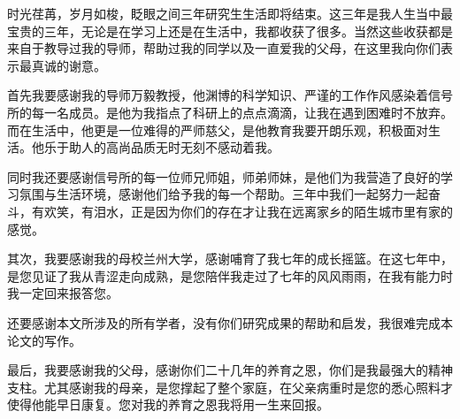 \begin{thanks}
时光荏苒，岁月如梭，眨眼之间三年研究生生活即将结束。这三年是我人生当中最宝贵的三年，无论是在学习上还是在生活中，我都收获了很多。当然这些收获都是来自于教导过我的导师，帮助过我的同学以及一直爱我的父母，在这里我向你们表示最真诚的谢意。

首先我要感谢我的导师万毅教授，他渊博的科学知识、严谨的工作作风感染着信号所的每一名成员。是他为我指点了科研上的点点滴滴，让我在遇到困难时不放弃。而在生活中，他更是一位难得的严师慈父，是他教育我要开朗乐观，积极面对生活。他乐于助人的高尚品质无时无刻不感动着我。

同时我还要感谢信号所的每一位师兄师姐，师弟师妹，是他们为我营造了良好的学习氛围与生活环境，感谢他们给予我的每一个帮助。三年中我们一起努力一起奋斗，有欢笑，有泪水，正是因为你们的存在才让我在远离家乡的陌生城市里有家的感觉。

其次，我要感谢我的母校兰州大学，感谢哺育了我七年的成长摇篮。在这七年中，是您见证了我从青涩走向成熟，是您陪伴我走过了七年的风风雨雨，在我有能力时我一定回来报答您。

还要感谢本文所涉及的所有学者，没有你们研究成果的帮助和启发，我很难完成本论文的写作。

最后，我要感谢我的父母，感谢你们二十几年的养育之恩，你们是我最强大的精神支柱。尤其感谢我的母亲，是您撑起了整个家庭，在父亲病重时是您的悉心照料才使得他能早日康复。您对我的养育之恩我将用一生来回报。
\end{thanks}
